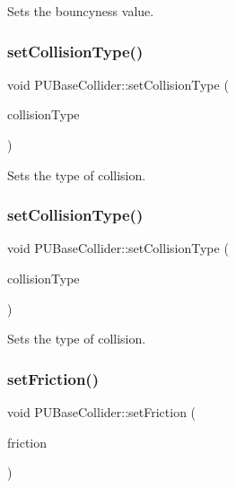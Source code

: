 Sets the bouncyness value. \mbox{\label{classPUBaseCollider_a5c29824036f36e8ab3f2553dddb66aa1}} 
\subsubsection{\texorpdfstring{set\+Collision\+Type()}{setCollisionType()}\hspace{0.1cm}{\footnotesize\ttfamily [1/2]}}
{\footnotesize\ttfamily void P\+U\+Base\+Collider\+::set\+Collision\+Type (\begin{DoxyParamCaption}\item[{const \hyperlink{classPUBaseCollider_a13f646d7a12d1abb3cca3043c817e726}{Collision\+Type} \&}]{collision\+Type }\end{DoxyParamCaption})}

Sets the type of collision. \mbox{\label{classPUBaseCollider_a5c29824036f36e8ab3f2553dddb66aa1}} 
\subsubsection{\texorpdfstring{set\+Collision\+Type()}{setCollisionType()}\hspace{0.1cm}{\footnotesize\ttfamily [2/2]}}
{\footnotesize\ttfamily void P\+U\+Base\+Collider\+::set\+Collision\+Type (\begin{DoxyParamCaption}\item[{const \hyperlink{classPUBaseCollider_a13f646d7a12d1abb3cca3043c817e726}{Collision\+Type} \&}]{collision\+Type }\end{DoxyParamCaption})}

Sets the type of collision. \mbox{\label{classPUBaseCollider_a13e2ba264ed65e0c38604bf14981c38c}} 
\subsubsection{\texorpdfstring{set\+Friction()}{setFriction()}\hspace{0.1cm}{\footnotesize\ttfamily [1/2]}}
{\footnotesize\ttfamily void P\+U\+Base\+Collider\+::set\+Friction (\begin{DoxyParamCaption}\item[{const float}]{friction }\end{DoxyParamCaption})}

